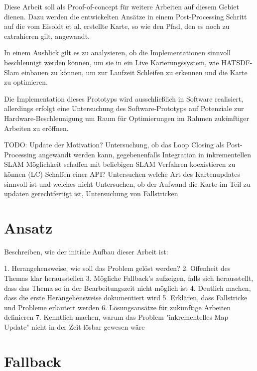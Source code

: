 Diese Arbeit soll als Proof-of-concept für weitere Arbeiten auf diesem Gebiet dienen. Dazu werden die entwickelten Ansätze in einem Post-Processing Schritt auf die vom Eisoldt et al. \cite{HATSDF} erstellte Karte, so wie den Pfad, den es noch zu extrahieren gilt, angewandt.


In einem Ausblick gilt es zu analysieren, ob die Implementationen sinnvoll beschleunigt werden können, um sie in ein Live Karierungssystem, wie HATSDF-Slam einbauen zu können, um zur Laufzeit Schleifen zu erkennen und die Karte zu optimieren.

Die Implementation dieses Prototyps wird ausschließlich in Software realisiert, allerdings erfolgt eine Untersuchung des Software-Prototyps auf Potenziale zur Hardware-Beschleunigung um Raum für Optimierungen im Rahmen zukünftiger Arbeiten zu eröffnen.

TODO: Update der Motivation? 
Untersuchung, ob das Loop Closing als Post-Processing angewandt werden kann, gegebenenfalls Integration in inkrementellen SLAM
Möglichkeit schaffen mit beliebigen SLAM Verfahren koexistieren zu können (LC)
Schaffen einer API?
Untersuchen welche Art des Kartenupdates sinnvoll ist und welches nicht
Untersuchen, ob der Aufwand die Karte im Teil zu updaten gerechtfertigt ist, Untersuchung von Fallstricken

\section{Ansatz}

Beschreiben, wie der initiale Aufbau dieser Arbeit ist:

1. Herangehensweise, wie soll das Problem gelöst werden?
2. Offenheit des Themas klar herausstellen
3. Mögliche Fallback's aufzeigen, falls sich herausstellt, dass das Thema so in der Bearbeitungszeit nicht möglich ist
4. Deutlich machen, dass die erste Herangehensweise dokumentiert wird
5. Erklären, dass Fallstricke und Probleme erläutert werden
6. Lösungsansätze für zukünftige Arbeiten definieren
7. Kenntlich machen, warum das Problem "inkrementelles Map Update" nicht in der Zeit lösbar gewesen wäre

\section{Fallback}


